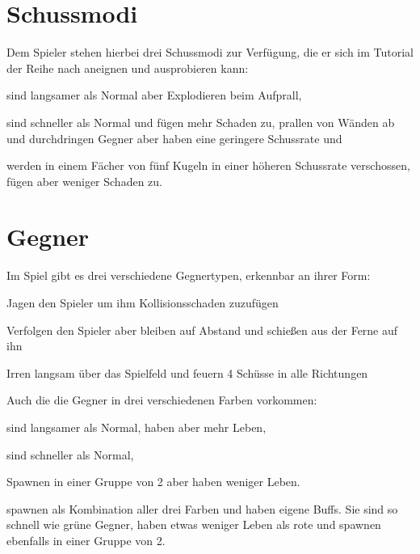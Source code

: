 \documentclass[a4paper,10pt,ngerman,fontsize=12pt]{scrreprt}
\begin{document}
\section{Schussmodi}

Dem Spieler stehen hierbei drei Schussmodi zur Verfügung, die er sich im Tutorial der Reihe nach aneignen und ausprobieren kann:

\renewcommand{\itmspace}{4.5em}
{sind langsamer als Normal aber Explodieren beim Aufprall,}

{sind schneller als Normal und fügen mehr Schaden zu, prallen von Wänden ab und durchdringen Gegner aber haben eine geringere Schussrate und}

{werden in einem Fächer von fünf Kugeln in einer höheren Schussrate verschossen, fügen aber weniger Schaden zu.}




\section{Gegner}

Im Spiel gibt es drei verschiedene Gegnertypen, erkennbar an ihrer Form:

\renewcommand{\itmspace}{7.5em}
{Jagen den Spieler um ihm Kollisionsschaden zuzufügen}

{Verfolgen den Spieler aber bleiben auf Abstand und schießen aus der Ferne auf ihn}

{Irren langsam über das Spielfeld und feuern 4 Schüsse in alle Richtungen}

Auch die die Gegner in drei verschiedenen Farben vorkommen:

\renewcommand{\itmspace}{7.5em}
{sind langsamer als Normal, haben aber mehr Leben,}

{sind schneller als Normal,}

{Spawnen in einer Gruppe von 2 aber haben weniger Leben.}

{spawnen als Kombination aller drei Farben und haben eigene Buffs. Sie sind so schnell wie grüne Gegner, haben etwas weniger Leben als rote und spawnen ebenfalls in einer Gruppe von 2.}
\end{document}
